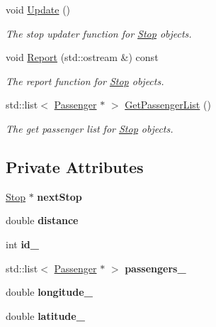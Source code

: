 \begin{figure}[H]
\begin{center}
\begin{DoxyCompactItemize}
void \hyperlink{classStop_aa373ae256ce6bc01ef13e876dfdec5bd}{Update} ()
\begin{DoxyCompactList}\small\item\em The stop updater function for \hyperlink{classStop}{Stop} objects. \end{DoxyCompactList}\item 
void \hyperlink{classStop_a8e286b7cca2dce6977ebda6f01805d94}{Report} (std\+::ostream \&) const
\begin{DoxyCompactList}\small\item\em The report function for \hyperlink{classStop}{Stop} objects. \end{DoxyCompactList}\item 
std\+::list$<$ \hyperlink{classPassenger}{Passenger} $\ast$ $>$ \hyperlink{classStop_a57c093d381664512dd576cf02a88bea6}{Get\+Passenger\+List} ()
\begin{DoxyCompactList}\small\item\em The get passenger list for \hyperlink{classStop}{Stop} objects. \end{DoxyCompactList}\end{DoxyCompactItemize}
\subsection*{Private Attributes}
\begin{DoxyCompactItemize}
\item 
\mbox{\label{classStop_aa687fb4e9e5876af53b0f40459ae9d49}} 
\hyperlink{classStop}{Stop} $\ast$ {\bfseries next\+Stop}
\item 
\mbox{\label{classStop_a62a29cc045a4e927a367eee662cc5d2d}} 
double {\bfseries distance}
\item 
\mbox{\label{classStop_a71becdbe8bf6168f72f9c8ea2b3dc0c4}} 
int {\bfseries id\+\_\+}
\item 
\mbox{\label{classStop_a1e75327b0aadd184120bf6a85eb641fa}} 
std\+::list$<$ \hyperlink{classPassenger}{Passenger} $\ast$ $>$ {\bfseries passengers\+\_\+}
\item 
\mbox{\label{classStop_a6fbad9a47cf803d0f43a60d3b954505c}} 
double {\bfseries longitude\+\_\+}
\item 
\mbox{\label{classStop_a4314074f0842c7e2483d341061bdb293}} 
double {\bfseries latitude\+\_\+}
\end{DoxyCompactItemize}



\end{center}
\end{figure}
